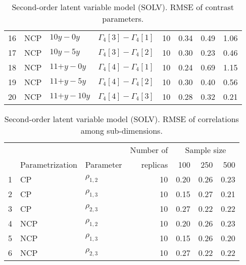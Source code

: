 \begin{table}[H]
\begin{tabular}{rlllrrrr}
		16 & NCP & \footnotesize{$10y - 0y$} & $\Gamma_{4}[3] - \Gamma_{4}[1]$ & 10 & 0.34 & 0.49 & 1.06 \\
		17 & NCP & \footnotesize{$10y - 5y$} & $\Gamma_{4}[3] - \Gamma_{4}[2]$ & 10 & 0.30 & 0.23 & 0.46 \\
		18 & NCP & \footnotesize{$11\text{+}y - 0y$} & $\Gamma_{4}[4] - \Gamma_{4}[1]$ & 10 & 0.24 & 0.69 & 1.15 \\ 
		19 & NCP & \footnotesize{$11\text{+}y - 5y$} & $\Gamma_{4}[4] - \Gamma_{4}[2]$ & 10 & 0.30 & 0.40 & 0.56 \\
		20 & NCP & \footnotesize{$11\text{+}y - 10y$} & $\Gamma_{4}[4] - \Gamma_{4}[3]$ & 10 & 0.28 & 0.32 & 0.21 \\    
		\hline
	\end{tabular}
	\caption[Second-order latent variable model (SOLV). RMSE of contrast parameters.]%
	{Second-order latent variable model (SOLV). RMSE of contrast parameters.} 
	\label{tab:SOLV_RMSE_contrasts}
\end{table}
%
\begin{table}[H]
	\centering
	\begin{tabular}{rllrrrr}
		\hline
		\multicolumn{3}{c}{ } & Number of &\multicolumn{3}{c}{ Sample size } \\ 
		\cmidrule(rl){5-7}
		& Parametrization  & Parameter & replicas & 100 & 250 & 500 \\  
		\hline\hline
		1 & CP & $\rho_{1,2}$ &  10 & 0.20 & 0.26 & 0.23 \\ 
		2 & CP & $\rho_{1,3}$ &  10 & 0.15 & 0.27 & 0.21 \\ 
		3 & CP & $\rho_{2,3}$ &  10 & 0.27 & 0.22 & 0.22 \\ 
		\hline
		4 & NCP & $\rho_{1,2}$ &  10 & 0.20 & 0.26 & 0.23 \\ 
		5 & NCP & $\rho_{1,3}$ &  10 & 0.15 & 0.26 & 0.20 \\ 
		6 & NCP & $\rho_{2,3}$ &  10 & 0.27 & 0.22 & 0.22 \\
		\hline
	\end{tabular}
	\caption[Second-order latent variable model (SOLV). RMSE of correlations among sub-dimensions.]%
	{Second-order latent variable model (SOLV). RMSE of correlations among sub-dimensions.}
	\label{tab:SOLV_RMSE_corr}
\end{table}
%
